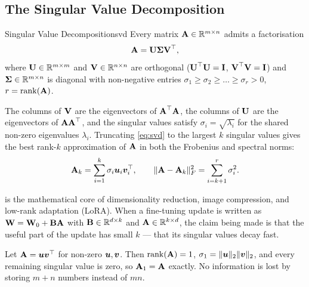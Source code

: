 \subsection{The Singular Value Decomposition}

\begin{theorem}{Singular Value Decomposition}{svd}
    Every matrix $\bm{\mathrm{A}} \in \mathbb{R}^{m \times n}$ admits a factorisation
    \begin{equation}
        \bm{\mathrm{A}} = \bm{\mathrm{U}} \bm{\mathrm{\Sigma}} \bm{\mathrm{V}}^{\top} ,
        \label{eq:svd}
    \end{equation}
    where $\bm{\mathrm{U}} \in \mathbb{R}^{m \times m}$ and $\bm{\mathrm{V}} \in \mathbb{R}^{n \times n}$ are
    orthogonal ($\bm{\mathrm{U}}^{\top}\bm{\mathrm{U}} = \bm{\mathrm{I}}$, $\bm{\mathrm{V}}^{\top}\bm{\mathrm{V}} = \bm{\mathrm{I}}$) and
    $\bm{\mathrm{\Sigma}} \in \mathbb{R}^{m \times n}$ is diagonal with non-negative entries
    $\sigma_1 \ge \sigma_2 \ge \dots \ge \sigma_r > 0$, $r = \operatorname{rank}(\bm{\mathrm{A}})$.
\end{theorem}

The columns of $\bm{\mathrm{V}}$ are the eigenvectors of $\bm{\mathrm{A}}^{\top}\bm{\mathrm{A}}$, the columns
of $\bm{\mathrm{U}}$ are the eigenvectors of $\bm{\mathrm{A}}\bm{\mathrm{A}}^{\top}$, and the singular values
satisfy $\sigma_i = \sqrt{\lambda_i}$ for the shared non-zero eigenvalues
$\lambda_i$. Truncating \cref{eq:svd} to the largest $k$ singular values gives
the best rank-$k$ approximation of $\bm{\mathrm{A}}$ in both the Frobenius and spectral
norms:
%
\begin{equation}
    \bm{\mathrm{A}}_k = \sum_{i=1}^{k} \sigma_i \bm{u}_i \bm{v}_i^{\top} ,
    \qquad
    \lVert\bm{\mathrm{A}} - \bm{\mathrm{A}}_k\rVert_F^2 = \sum_{i=k+1}^{r} \sigma_i^2 .
    \label{eq:eckart-young}
\end{equation}

\begin{intuition}
     is the mathematical core of dimensionality reduction,
    image compression, and low-rank adaptation (LoRA). When a fine-tuning update
    is written as $\bm{\mathrm{W}} = \bm{\mathrm{W}}_0 + \bm{\mathrm{B}}\bm{\mathrm{A}}$ with
    $\bm{\mathrm{B}} \in \mathbb{R}^{d \times k}$ and $\bm{\mathrm{A}} \in \mathbb{R}^{k \times d}$, the claim
    being made is that the useful part of the update has small $k$ --- that its
    singular values decay fast.
\end{intuition}

\begin{example}
    Let $\bm{\mathrm{A}} = \bm{u}\bm{v}^{\top}$ for non-zero $\bm{u}, \bm{v}$. Then
    $\operatorname{rank}(\bm{\mathrm{A}}) = 1$, $\sigma_1 = \lVert\bm{u}\rVert_2\lVert\bm{v}\rVert_2$, and
    every remaining singular value is zero, so $\bm{\mathrm{A}}_1 = \bm{\mathrm{A}}$ exactly.
    No information is lost by storing $m + n$ numbers instead of $mn$.
\end{example}

